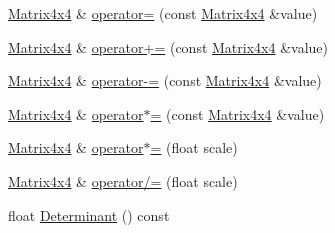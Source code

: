 \begin{DoxyCompactItemize}
\mbox{\hyperlink{struct_math_1_1_matrix4x4}{Matrix4x4}} \& \mbox{\hyperlink{struct_math_1_1_matrix4x4_a9ee081e0ca62967af780d4979a58deb2}{operator=}} (const \mbox{\hyperlink{struct_math_1_1_matrix4x4}{Matrix4x4}} \&value)
\item 
\mbox{\hyperlink{struct_math_1_1_matrix4x4}{Matrix4x4}} \& \mbox{\hyperlink{struct_math_1_1_matrix4x4_a718f2e437d7a81545cbc09e94a14be17}{operator+=}} (const \mbox{\hyperlink{struct_math_1_1_matrix4x4}{Matrix4x4}} \&value)
\item 
\mbox{\hyperlink{struct_math_1_1_matrix4x4}{Matrix4x4}} \& \mbox{\hyperlink{struct_math_1_1_matrix4x4_a50317a53f50d2f657ddaf9882120a895}{operator-\/=}} (const \mbox{\hyperlink{struct_math_1_1_matrix4x4}{Matrix4x4}} \&value)
\item 
\mbox{\hyperlink{struct_math_1_1_matrix4x4}{Matrix4x4}} \& \mbox{\hyperlink{struct_math_1_1_matrix4x4_a44bf597aad18c77f05d265cf88258207}{operator$\ast$=}} (const \mbox{\hyperlink{struct_math_1_1_matrix4x4}{Matrix4x4}} \&value)
\item 
\mbox{\hyperlink{struct_math_1_1_matrix4x4}{Matrix4x4}} \& \mbox{\hyperlink{struct_math_1_1_matrix4x4_a2c940c611c86e4d27b8443a49710f29f}{operator$\ast$=}} (float scale)
\item 
\mbox{\hyperlink{struct_math_1_1_matrix4x4}{Matrix4x4}} \& \mbox{\hyperlink{struct_math_1_1_matrix4x4_af4b1bfd9239ce87f82090f05645c08c3}{operator/=}} (float scale)
\item 
float \mbox{\hyperlink{struct_math_1_1_matrix4x4_ab848d45dfc3a1efb60601214488d2e4a}{Determinant}} () const
\end{DoxyCompactItemize}
